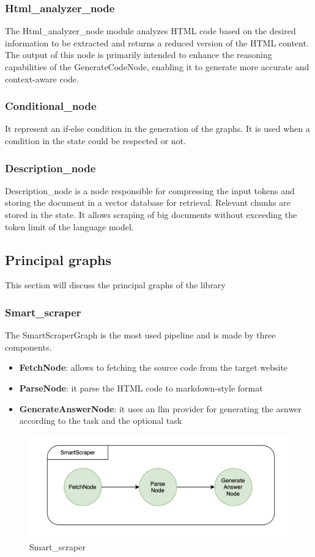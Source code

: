 \subsubsection{Html\_analyzer\_node}
The Html\_analyzer\_node module analyzes HTML code based on the desired information to be extracted and returns a reduced version of the HTML content. The output of this node is primarily intended to enhance the reasoning capabilities of the GenerateCodeNode, enabling it to generate more accurate and context-aware code.

\subsubsection{Conditional\_node}
It represent an if-else condition in the generation of the graphs. It is used when a condition in the state could be respected or not.

\subsubsection{Description\_node}
Description\_node is a node responsible for compressing the input tokens and storing the document in a vector database for retrieval. Relevant chunks are stored in the state. It allows scraping of big documents without exceeding the token limit of the language model.

\subsection{Principal graphs}

This section will discuss the principal graphs of the library
\subsubsection{Smart\_scraper}
The SmartScraperGraph is the most used pipeline and is made by three components.
\begin{itemize}
    \item \textbf{FetchNode}: allows to fetching the source code from the target website
    \item \textbf{ParseNode}: it parse the HTML code to markdown-style format
    \item \textbf{GenerateAnswerNode}: it uses an llm provider for generating the asnwer according to the task and the optional task
\end{itemize}
\begin{figure}[H]
    \centering
    \includegraphics[width=0.75\linewidth]{Assets/smart_scraper.png}
    \caption{Smart\_scraper}
    \label{fig:smart_scraper}
\end{figure}

